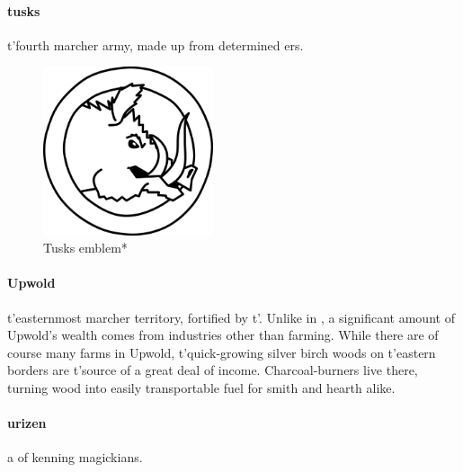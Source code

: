\paragraph{tusks} t'\allowbreak fourth marcher army, made up from determined ers.  \begin{figure}\centering\includegraphics[width=5cm]{encyclopedia/Tusks}\caption{Tusks emblem*}\end{figure}
\paragraph{Upwold} t'\allowbreak easternmost marcher territory, fortified by t'\allowbreak {}. Unlike in , a significant amount of Upwold's wealth comes from industries other than farming. While there are of course many farms in Upwold, t'\allowbreak quick-growing silver birch woods on t'\allowbreak eastern borders are t'\allowbreak source of a great deal of income. Charcoal-burners live there, turning wood into easily transportable fuel for smith and hearth alike.
\paragraph{urizen} a  of kenning magickians.
